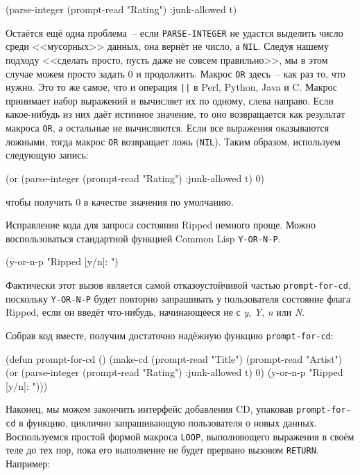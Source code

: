 \begin{myverb}
(parse-integer (prompt-read "Rating") :junk-allowed t)
\end{myverb}

Остаётся ещё одна проблема~-- если \lstinline{PARSE-INTEGER} не удастся выделить число среди
<<мусорных>> данных, она вернёт не число, а \lstinline{NIL}. Следуя нашему подходу <<сделать
просто, пусть даже не совсем правильно>>, мы в этом случае можем просто задать 0 и
продолжить. Макрос \lstinline{OR} здесь~-- как раз то, что нужно. Это то же самое, что и
операция \lstinline{||} в Perl, Python, Java и C. Макрос принимает набор выражений и
вычисляет их по одному, слева направо. Если какое-нибудь из них даёт истинное значение, то
оно возвращается как результат макроса \lstinline{OR}, а остальные не вычисляются. Если
все выражения оказываются ложными, тогда макрос \lstinline{OR} возвращает ложь
(\lstinline{NIL}). Таким образом, используем следующую запись:

\begin{myverb}
(or (parse-integer (prompt-read "Rating") :junk-allowed t) 0)
\end{myverb}

\noindent{}чтобы получить 0 в качестве значения по умолчанию.

Исправление кода для запроса состояния Ripped немного проще. Можно воспользоваться
стандартной функцией Common Lisp \lstinline{Y-OR-N-P}.

\begin{myverb}
(y-or-n-p "Ripped [y/n]: ")
\end{myverb}

Фактически этот вызов является самой отказоустойчивой частью \lstinline{prompt-for-cd},
поскольку \lstinline{Y-OR-N-P} будет повторно запрашивать у пользователя состояние флага
Ripped, если он введёт что-нибудь, начинающееся не с \textit{y}, \textit{Y}, \textit{n}
или \textit{N}.

Собрав код вместе, получим достаточно надёжную функцию \lstinline{prompt-for-cd}:

\begin{myverb}
(defun prompt-for-cd ()
  (make-cd
   (prompt-read "Title")
   (prompt-read "Artist")
   (or (parse-integer (prompt-read "Rating") :junk-allowed t) 0)
   (y-or-n-p "Ripped [y/n]: ")))
\end{myverb}

Наконец, мы можем закончить интерфейс добавления CD, упаковав \lstinline{prompt-for-cd} в
функцию, циклично запрашивающую пользователя о новых данных. Воспользуемся простой формой
макроса \lstinline{LOOP}, выполняющего выражения в своём теле до тех пор, пока его выполнение
не будет прервано вызовом \lstinline{RETURN}. Например:

